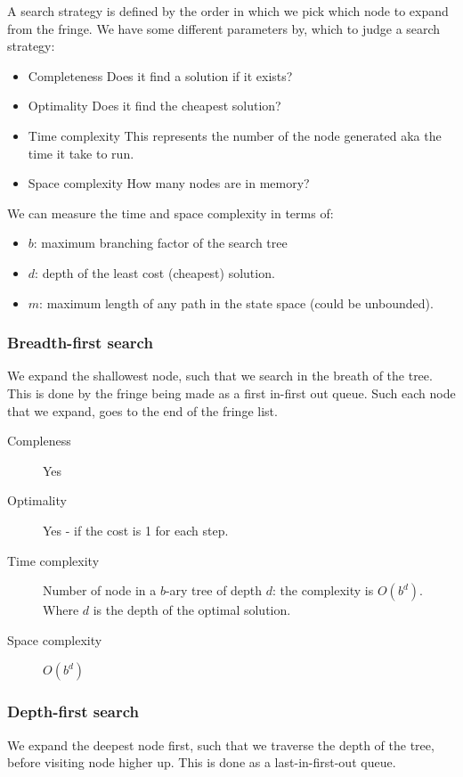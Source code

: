 \documentclass{article}
\begin{document}
A search strategy is defined by the order in which we pick which node to expand
from the fringe. We have some different parameters by, which to judge a search
strategy:
\begin{itemize}[noitemsep]
  \item Completeness
    \subitem Does it find a solution if it exists?
  \item Optimality
    \subitem Does it find the cheapest solution?
  \item Time complexity
    \subitem This represents the number of the node generated aka the time it
    take to run.
  \item Space complexity
    \subitem How many nodes are in memory?
\end{itemize}
We can measure the time and space complexity in terms of:
\begin{itemize}
  \item $b$: maximum branching factor of the search tree
  \item $d$: depth of the least cost (cheapest) solution.
  \item $m$: maximum length of any path in the state space (could be unbounded).
\end{itemize}

\subsubsection{Breadth-first search}%
\label{par:breadth_first_search}
We expand the shallowest node, such that we search in the breath of the tree.
This is done by the fringe being made as a first in-first out queue. Such each
node that we expand, goes to the end of the fringe list.

\begin{description}
  \item[Compleness] Yes
  \item[Optimality] Yes - if the cost is 1 for each step.
  \item[Time complexity] Number of node in a $b$-ary tree of depth $d$: the
    complexity is $O(b^d)$. Where $d$ is the depth of the optimal solution.
  \item[Space complexity] $O(b^d)$
\end{description}

\subsubsection{Depth-first search}%
\label{par:depth_first_search}
We expand the deepest node first, such that we traverse the depth of the tree,
before visiting node higher up. This is done as a last-in-first-out queue.
\end{document}
